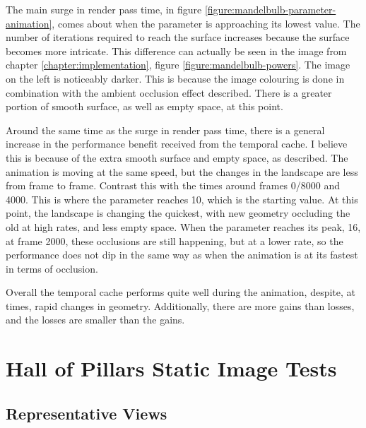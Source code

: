 The main surge in render pass time, in figure \ref{figure:mandelbulb-parameter-animation}, comes about when the parameter is approaching its lowest value. The number of iterations required to reach the surface increases because the surface becomes more intricate. This difference can actually be seen in the image from chapter \ref{chapter:implementation}, figure \ref{figure:mandelbulb-powers}. The image on the left is noticeably darker. This is because the image colouring is done in combination with the ambient occlusion effect described. There is a greater portion of smooth surface, as well as empty space, at this point.\newline

Around the same time as the surge in render pass time, there is a general increase in the performance benefit received from the temporal cache. I believe this is because of the extra smooth surface and empty space, as described. The animation is moving at the same speed, but the changes in the landscape are less from frame to frame. Contrast this with the times around frames 0/8000 and 4000. This is where the parameter reaches 10, which is the starting value. At this point, the landscape is changing the quickest, with new geometry occluding the old at high rates, and less empty space. When the parameter reaches its peak, 16, at frame 2000, these occlusions are still happening, but at a lower rate, so the performance does not dip in the same way as when the animation is at its fastest in terms of occlusion.\newline

Overall the temporal cache performs quite well during the animation, despite, at times, rapid changes in geometry. Additionally, there are more gains than losses, and the losses are smaller than the gains.

\section{Hall of Pillars Static Image Tests}

\subsection{Representative Views}

